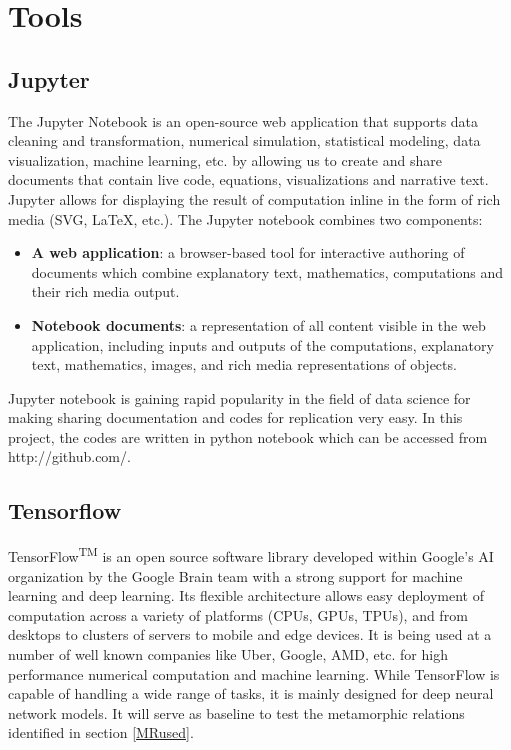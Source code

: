 \section{Tools}
\subsection{Jupyter}
The Jupyter Notebook is an open-source web application that supports data cleaning and transformation, numerical simulation, statistical modeling, data visualization, machine learning, etc. by allowing us to create and share documents that contain live code, equations, visualizations and narrative text. Jupyter allows for displaying the result of computation inline in the form of rich media (SVG, LaTeX, etc.). The Jupyter notebook combines two components:
\begin{itemize}
  \item \textbf{A web application}: a browser-based tool for interactive authoring of documents which combine explanatory text, mathematics, computations and their rich media output.
  \item \textbf{Notebook documents}: a representation of all content visible in the web application, including inputs and outputs of the computations, explanatory text, mathematics, images, and rich media representations of objects.
\end{itemize}
Jupyter notebook is gaining rapid popularity in the field of data science for making sharing documentation and codes for replication very easy. In this project, the codes are written in python notebook which can be accessed from http://github.com/.

\subsection{Tensorflow}
TensorFlow\textsuperscript{TM} is an open source software library developed within Google’s AI organization by the Google Brain team with a strong support for machine learning and deep learning. Its flexible architecture allows easy deployment of computation across a variety of platforms (CPUs, GPUs, TPUs), and from desktops to clusters of servers to mobile and edge devices. It is being used at a number of well known companies like Uber, Google, AMD, etc. for high performance numerical computation and machine learning. While TensorFlow is capable of handling a wide range of tasks, it is mainly designed for deep neural network models. It will serve as baseline to test the metamorphic relations identified in section \ref{MRused}.


